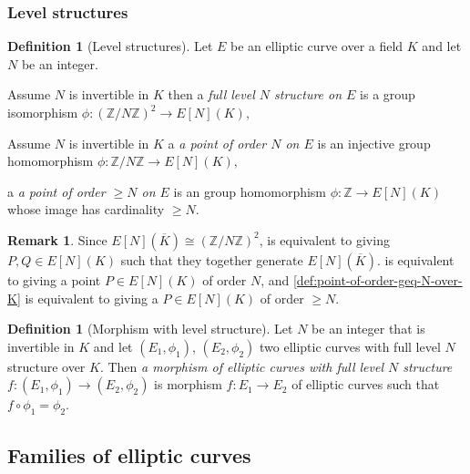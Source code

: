 \documentclass[a4paper,12pt,reqno]{amsart}
\newcommand{\field}[1]{\mathbb{#1}}  %
\newcommand{\Z}{\field{Z}} %
\theoremstyle{definition}
\newtheorem{definition}[lemma]{Definition}
\newtheorem{remark}[lemma]{Remark}
\numberwithin{lemma}{section}
\numberwithin{equation}{section}
\numberwithin{figure}{section}
\begin{document}
\subsubsection{Level structures}

\begin{definition}[Level structures]
	Let $E$ be an elliptic curve over a field $K$ and let $N$ be an integer. 
	\begin{defenum}
		\item Assume $N$ is invertible in $K$ then a \textit{full level $N$ structure on $E$} is a group isomorphism $\phi: (\Z/N\Z)^2 \to  E[N](K),$ \label{def:full-level-structure-over-K}
		\item Assume $N$ is invertible in $K$  a \textit{a point of order $N$ on $E$} is an injective group homomorphism $\phi: \Z/N\Z \to  E[N](K),$ \label{def:point-of-order-N-over-K}
		\item  a \textit{a point of order $\geq N$ on $E$} is an group homomorphism $\phi: \Z \to  E[N](K)$ whose image has cardinality $\geq N$. \label{def:point-of-order-geq-N-over-K}
	\end{defenum}
\end{definition}
\begin{remark}\label{rem:alternative-def-level-structure}
Since $E[N](\overline K) \cong  (\Z/N\Z)^2$,  is equivalent to giving $P,Q \in E[N](K)$ such that they together generate $E[N](\overline K)$.  is equivalent to giving a point $P \in E[N](K)$ of order $N$, and \cref{def:point-of-order-geq-N-over-K} is equivalent to giving a $P \in E[N](K)$ of order $\geq N$.
\end{remark}

\begin{definition}[Morphism with level structure]
Let $N$ be an integer that is invertible in $K$ and let $(E_1,\phi_1)$, $(E_2,\phi_2)$ two elliptic curves with full level $N$ structure over $K$. Then \textit{a morphism of elliptic curves with full level $N$ structure}  $f: (E_1,\phi_1) \to (E_2,\phi_2)$ is morphism $f: E_1 \to E_2$ of elliptic curves such that $f \circ \phi_1 = \phi_2$.
\end{definition}



\subsection{Families of elliptic curves}
\end{document}
